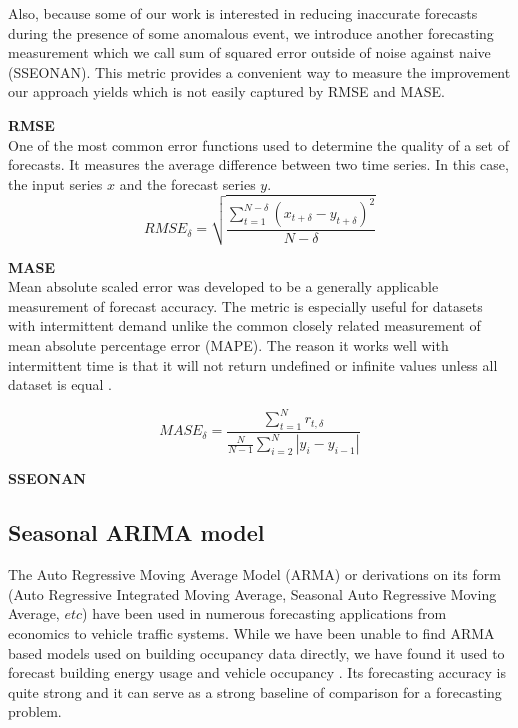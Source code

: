 Also, because some of our work is interested in reducing inaccurate forecasts during the presence of some anomalous event, we introduce another forecasting measurement which we call sum of squared error outside of noise against naive (SSEONAN).  This metric provides a convenient way to measure the improvement our approach yields which is not easily captured by RMSE and MASE.

\bigskip
\noindent \textbf{RMSE} \\
One of the most common error functions used to determine the quality of a set of forecasts.  It measures the average difference between two time series.  In this case, the input series $x$ and the forecast series $y$.
\begin{equation}
RMSE_{\delta} = \sqrt{\frac{\sum_{t = 1}^{N - \delta}{(x_{t + \delta} - y_{t + \delta})^{2}}}{N - \delta}}
\end{equation}

\bigskip
\noindent \textbf{MASE} \\
Mean absolute scaled error was developed to be a generally applicable measurement of forecast accuracy.  The metric is especially useful for datasets with intermittent demand unlike the common closely related measurement of mean absolute percentage error (MAPE).  The reason it works well with intermittent time is that it will not return undefined or infinite values unless all dataset is equal \cite{Hyndman2008}.

\begin{equation}
MASE_{\delta} = \frac{\sum_{t = 1}^{N}{r_{t, \delta}}}{\frac{N}{N - 1}\sum_{i = 2}^{N}|y_{i} - y_{i - 1}|}
\end{equation}

\noindent \textbf{SSEONAN} \\



\subsection{Seasonal ARIMA model}
The Auto Regressive Moving Average Model (ARMA) or derivations on its form (Auto Regressive Integrated Moving Average, Seasonal Auto Regressive Moving Average, $etc$) have been used in numerous forecasting applications from economics to vehicle traffic systems.  While we have been unable to find ARMA based models used on building occupancy data directly, we have found it used to forecast building energy usage and vehicle occupancy \cite{Williams2003, Hong2011, Newsham2010}.  Its forecasting accuracy is quite strong and it can serve as a strong baseline of comparison for a forecasting problem.  

